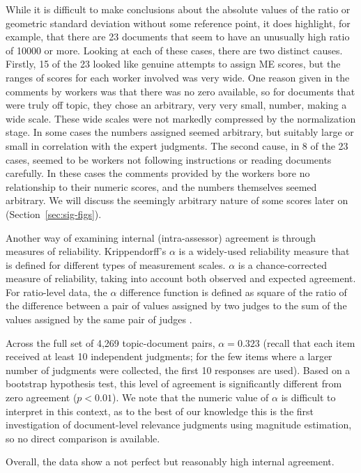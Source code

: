 While it is difficult to make conclusions about the absolute values of
the ratio or geometric standard deviation without some reference point, it does highlight, for
example, that there are 23 documents that seem to have an
unusually high ratio of 10000 or more.
Looking at each of these cases, there are two distinct causes.
Firstly, 15 of the 23 looked like genuine attempts to assign ME scores,
but the ranges of scores for each worker involved was very wide.
One reason given in the comments by workers was that there was no zero
available, so for documents that were truly off topic, they chose an
arbitrary, very very small, number, making a wide scale.
These wide scales were not markedly compressed by the normalization
stage.
In some cases the numbers assigned seemed arbitrary, but suitably
large or small in correlation with the expert judgments.
The second cause, in 8 of the 23 cases, seemed to be workers not
following instructions or reading documents carefully.
In these cases the comments provided by the workers bore no
relationship to their numeric scores, and the numbers themselves
seemed arbitrary.
We will discuss the seemingly arbitrary nature of some scores later on
(Section~\ref{sec:sig-figs}). 

Another way of examining internal (intra-assessor) agreement is through
measures of reliability. Krippendorff's $\alpha$ \citep{HayKri07} is a
widely-used reliability measure that is defined for different types of
measurement scales.
$\alpha$ is a chance-corrected measure
of reliability, taking into account both observed and expected
agreement.
For ratio-level data, the $\alpha$ difference function is defined as
square of the ratio of the difference between a pair of values assigned
by two judges to
the sum of the values assigned by the same pair of judges \citep{Kri11}.

Across the full set of 4,269 topic-document pairs, $\alpha=0.323$
(recall that each item received at least 10 independent judgments; for
the few items where a larger number of judgments were collected, the
first 10 responses are used).
Based on a bootstrap hypothesis test, this level of agreement is
significantly different from zero agreement ($p<0.01$).
We note that the numeric value of $\alpha$ is difficult to interpret in
this context, as to the best of our knowledge this is the first
investigation of document-level relevance judgments using magnitude
estimation, so no direct comparison is available.

Overall, the data show a not perfect but reasonably high
internal agreement.

